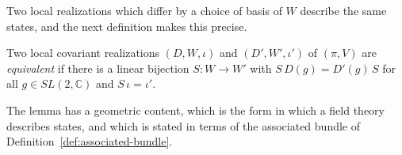 \noindent Two local realizations which differ by a choice of basis of $W$ describe the same states, and the next definition makes this precise.

\begin{definition}\label{def:equivalent-local-realizations}
	Two local covariant realizations $(D,W,\iota)$ and $(D',W',\iota')$ of $(\pi,V)$ are \emph{equivalent} if there is a linear bijection $S:W\to W'$ with $S\,D(g)=D'(g)\,S$ for all $g\in SL(2,\mathbb{C})$ and $S\,\iota=\iota'$.
\end{definition}

The lemma has a geometric content, which is the form in which a field theory describes states, and which is stated in terms of the associated bundle of Definition~\ref{def:associated-bundle}.

